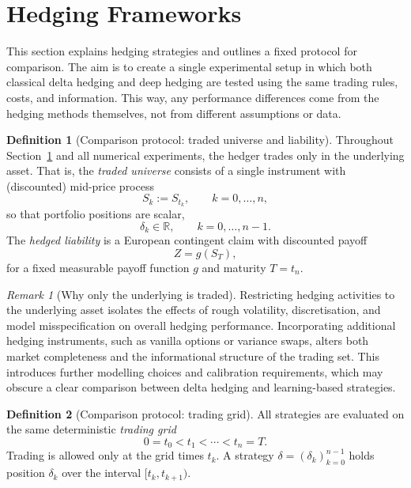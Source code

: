 \documentclass[12pt,a4paper]{article}
\theoremstyle{definition}
\newtheorem{definition}{Definition}[section]
\theoremstyle{plain}
\theoremstyle{remark}
\newtheorem{remark}{Remark}[section]
\theoremstyle{plain}
\begin{document}
\newpage

\section{Hedging Frameworks}
\label{sec:hedging_frameworks}

\noindent
This section explains hedging strategies and outlines a fixed protocol for comparison.
The aim is to create a single experimental setup in which both classical delta hedging and deep hedging are tested using the same trading rules, costs, and information. This way, any performance differences come from the hedging methods themselves, not from different assumptions or data.

\medskip

\begin{definition}[Comparison protocol: traded universe and liability]
\label{def:comparison_universe}
Throughout Section~\ref{sec:hedging_frameworks} and all numerical experiments, the hedger trades only in the underlying asset.
That is, the \emph{traded universe} consists of a single instrument with (discounted) mid-price process
\[
S_k := S_{t_k}, \qquad k=0,\dots,n,
\]
so that portfolio positions are scalar,
\[
\delta_k \in \mathbb{R}, \qquad k=0,\dots,n-1.
\]
The \emph{hedged liability} is a European contingent claim with discounted payoff
\[
Z = g(S_T),
\]
for a fixed measurable payoff function $g$ and maturity $T=t_n$.
\end{definition}

\begin{remark}[Why only the underlying is traded]
\label{rem:only_underlying}
Restricting hedging activities to the underlying asset isolates the effects of rough volatility, discretisation, and model misspecification on overall hedging performance.
Incorporating additional hedging instruments, such as vanilla options or variance swaps, alters both market completeness and the informational structure of the trading set. This introduces further modelling choices and calibration requirements, which may obscure a clear comparison between delta hedging and learning-based strategies.
\end{remark}

\begin{definition}[Comparison protocol: trading grid]
\label{def:comparison_grid}
All strategies are evaluated on the same deterministic \emph{trading grid}
\[
0=t_0 < t_1 < \cdots < t_n = T.
\]
Trading is allowed only at the grid times $t_k$.
A strategy $\delta=(\delta_k)_{k=0}^{n-1}$ holds position $\delta_k$ over the interval $[t_k,t_{k+1})$.
\end{definition}
\end{document}
